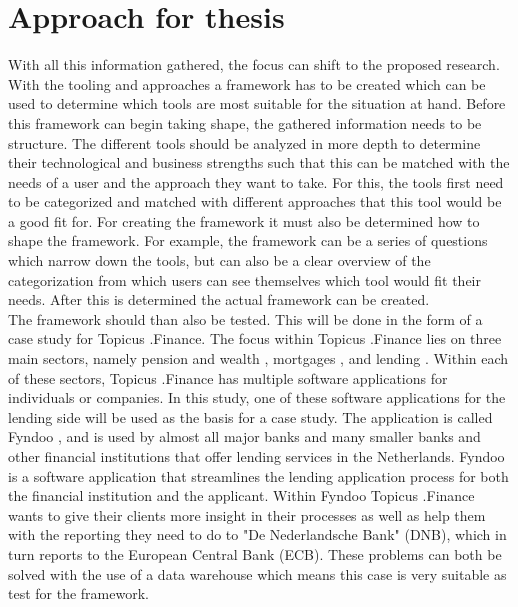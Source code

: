 \documentclass[11pt]{article}
\begin{document}
\section{Approach for thesis}
\label{approach}
With all this information gathered, the focus can shift to the proposed research. With the tooling and approaches a framework has to be created which can be used to determine which tools are most suitable for the situation at hand. Before this framework can begin taking shape, the gathered information needs to be structure. The different tools should be analyzed in more depth to determine their technological and business strengths such that this can be matched with the needs of a user and the approach they want to take. For this, the tools first need to be categorized and matched with different approaches that this tool would be a good fit for. For creating the framework it must also be determined how to shape the framework. For example, the framework can be a series of questions which narrow down the tools, but can also be a clear overview of the categorization from which users can see themselves which tool would fit their needs. After this is determined the actual framework can be created. \\

The framework should than also be tested. This will be done in the form of a case study for Topicus .Finance. The focus within Topicus .Finance lies on three main sectors, namely pension and wealth \cite{pension},  mortgages \cite{mortgages}, and lending \cite{businesslending}. Within each of these sectors, Topicus .Finance has multiple software applications for individuals or companies. In this study, one of these software applications for the lending side will be used as the basis for a case study. The application is called Fyndoo \cite{fyndoo}, and is used by almost all major banks and many smaller banks and other financial institutions that offer lending services in the Netherlands. Fyndoo is a software application that streamlines the lending application process for both the financial institution and the applicant. Within Fyndoo Topicus .Finance wants to give their clients more insight in their processes as well as help them with the reporting they need to do to "De Nederlandsche Bank" (DNB), which in turn reports to the European Central Bank (ECB). These problems can both be solved with the use of a data warehouse which means this case is very suitable as test for the framework. \\
\end{document}
